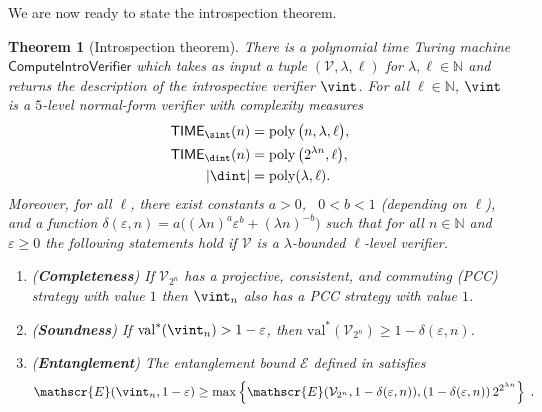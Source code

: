 \documentclass[11pt]{article}
\newtheorem{theorem}{Theorem}[section]
\theoremstyle{definition}
\newcommand{\N}{\ensuremath{\mathbb{N}}}
\DeclareMathOperator{\poly}{poly}
\newcommand{\val}{\ensuremath{\mathrm{val}}}
\newcommand{\eps}{\varepsilon}
\newcommand{\verifier}{\mathcal{V}}
\newcommand{\Ent}{\mathscr{E}}
\newcommand{\TIME}{\mathsf{TIME}}
\newcommand{\tmstyle}[1]{\ensuremath{\mathsf{#1}}}
\newcommand{\ComputeIntroVerifier}{\tmstyle{ComputeIntroVerifier}}
\begin{document}
We are now ready to state the introspection theorem.

\begin{theorem}[Introspection theorem]
  \label{thm:introspection}
  There is a polynomial time Turing machine $\ComputeIntroVerifier$ which takes
  as input a tuple $(\verifier, \lambda, \ell)$ for $\lambda, \ell \in \N$ and
  returns the description of the introspective verifier $\vint$.
  For all $\ell \in \N$, $\vint$ is a $5$-level normal-form verifier
  with complexity measures
  \begin{equation*}
    \begin{split}
      \TIME_{\sint}(n) & = \poly \big (n, \lambda, \ell \big),\\
      \TIME_{\dint}(n) & = \poly \big (2^{\lambda n}, \ell \big),\\
      |\dint| &= \poly(\lambda,\ell).
    \end{split}
  \end{equation*}
  Moreover, for all $\ell$, there exist constants $a>0$, \, $0 < b < 1$ (depending on $\ell$),
  and a function $\delta(\eps, n) = a \bigl( (\lambda n)^a\eps^b + (\lambda
  n)^{-b} \bigr)$ such that for all $n \in \N$ and $\eps \ge 0$ the following
  statements hold if $\verifier$ is a $\lambda$-bounded $\ell$-level verifier.
  \begin{enumerate}
  \item (\textbf{Completeness}) If $\verifier_{2^n}$ has a projective, consistent,
    and commuting (PCC) strategy with value $1$ then $\vint_n$ also
    has a PCC strategy with value $1$.

  \item (\textbf{Soundness}) If $\val^*(\vint_n) > 1 - \eps$, then
    $\val^*(\verifier_{2^n}) \geq 1 - \delta(\eps,n)$.
  \item (\textbf{Entanglement}) The entanglement bound $\Ent$ defined
    in  satisfies
    \begin{equation*}
      \Ent(\vint_n, 1 - \eps) \geq \max
      \left \{ \Ent(\verifier_{2^n}, 1 - \delta(\eps,n)),
        (1 - \delta(\eps,n))\, 2^{2^{\lambda n}} \right \}\;.
    \end{equation*}
  \end{enumerate}
\end{theorem}
\end{document}
